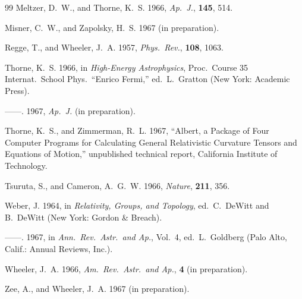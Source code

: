 \begin{thebibliography}{99}
Meltzer, D.~W., and Thorne, K.~S. 1966, \textit{Ap.~J.}, \textbf{145}, 514.

Misner, C.~W., and Zapolsky, H.~S. 1967 (in preparation).

Regge, T., and Wheeler, J.~A. 1957, \textit{Phys.~Rev.}, \textbf{108}, 1063.

Thorne, K.~S. 1966, in \textit{High-Energy Astrophysics}, Proc.\ Course 35 Internat.\ School Phys.\ ``Enrico Fermi,'' ed.\ L.\ Gratton (New York: Academic Press).

------. 1967, \textit{Ap.~J.} (in preparation).

Thorne, K.~S., and Zimmerman, R.~L. 1967, ``Albert, a Package of Four Computer Programs for Calculating General Relativistic Curvature Tensors and Equations of Motion,'' unpublished technical report, California Institute of Technology.

Tsuruta, S., and Cameron, A.~G.~W. 1966, \textit{Nature}, \textbf{211}, 356.

Weber, J. 1964, in \textit{Relativity, Groups, and Topology}, ed.\ C.\ DeWitt and B.\ DeWitt (New York: Gordon \& Breach).

------. 1967, in \textit{Ann.~Rev.~Astr.\ and Ap.}, Vol.\ 4, ed.\ L.\ Goldberg (Palo Alto, Calif.: Annual Reviews, Inc.).

Wheeler, J.~A. 1966, \textit{Am.~Rev.~Astr.\ and Ap.}, \textbf{4} (in preparation).

Zee, A., and Wheeler, J.~A. 1967 (in preparation).

\end{thebibliography}
